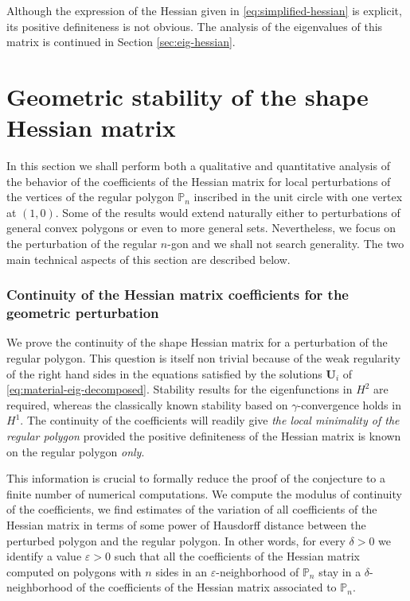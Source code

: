 \documentclass[JEP,XML,SOM,Unicode,ThmDefs,NoFloatCountersInSection,published]{cedram}
\theoremstyle{plain}
\theoremstyle{definition}
\newcommand{\bo}[1]{{\boldsymbol#1}}
\newcommand{\vps}{\varepsilon}
\begin{document}
Although the expression of the Hessian given in \eqref{eq:simplified-hessian} is explicit, its positive definiteness is not obvious. The analysis of the eigenvalues of this matrix is continued in Section \ref{sec:eig-hessian}.

\section{Geometric stability of the shape Hessian matrix}\label{bobus3}
In this section we shall perform both a qualitative and quantitative analysis of the behavior of the coefficients of the Hessian matrix for local perturbations of the vertices of the regular polygon $\mathbb P_n$ inscribed in the unit circle with one vertex at $(1,0)$. Some of the results would extend naturally either to perturbations of general convex polygons or even to more general sets. Nevertheless, we focus on the perturbation of the regular $n$-gon and we shall not search generality. The two main technical aspects of this section are described below.

\subsubsection*{Continuity of the Hessian matrix coefficients for the geometric perturbation}
We prove the continuity of the shape Hessian matrix for a perturbation of the regular polygon. This question is itself non trivial because of the weak regularity of the right hand sides in the equations satisfied by the solutions $\bo U_i$ of \eqref{eq:material-eig-decomposed}. Stability results for the eigenfunctions in $H^2$ are required, whereas the classically known stability based on $\gamma$-convergence holds in $H^1$. The continuity of the coefficients will readily give {\it the local minimality of the regular polygon} provided the positive definiteness of the Hessian matrix is known on the regular polygon {\it only}.

This information is crucial to formally reduce the proof of the conjecture to a finite number of numerical computations. We compute the modulus of continuity of the coefficients, \ie we find estimates of the variation of all coefficients of the Hessian matrix in terms of some power of Hausdorff distance between the perturbed polygon and the regular polygon. In other words, for every $\delta >0$ we identify a value $\vps >0$ such that all the coefficients of the Hessian matrix computed on polygons with $n$ sides in an $\vps$-neighborhood of $\mathbb P_n$ stay in a $\delta$-neighborhood of the coefficients of the Hessian matrix associated to $\mathbb P_n$.
\end{document}
